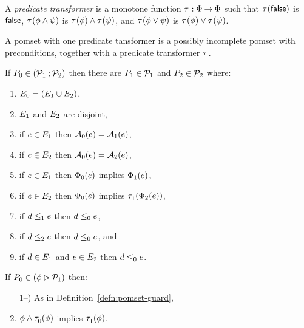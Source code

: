 \begin{definition}
  A \emph{predicate transformer} is a monotone function
  $\tau^{}:\Phi\mathbin\rightarrow\Phi$ such that
  $\tau^{}(\mathsf{false})$ is $\mathsf{false}$,
  $\tau^{}(\phi\land\psi)$ is $\tau^{}(\phi)\land\tau^{}(\psi)$, and
  $\tau^{}(\phi\lor\psi)$ is $\tau^{}(\phi)\lor\tau^{}(\psi)$.
\end{definition}

\begin{definition}
  A pomset with one predicate tansformer is a possibly incomplete
  pomset with preconditions, together with a predicate transformer $\tau^{}$.
\end{definition}

\begin{definition}
  If $P_0 \in (\mathcal{P}_1\mathbin{;}\mathcal{P}_2)$ then
  there are $P_1\in\mathcal{P}_1$ and $P_2\in\mathcal{P}_2$ where:
  \begin{enumerate}
  \item $E_0 = (E_1\cup E_2)$,
  \item $E_1$ and  $E_2$ are disjoint,
  \item if $e\in E_1$ then $\mathcal{A}_0(e) = \mathcal{A}_1(e)$, 
  \item if $e\in E_2$ then $\mathcal{A}_0(e) = \mathcal{A}_2(e)$,
  \item if $e\in E_1$ then $\Phi_0(e)$ implies $\Phi_1(e)$, 
  \item if $e\in E_2$ then $\Phi_0(e)$ implies $\tau^{}_1(\Phi_2(e))$,
  \item if $d\le_1e$ then $d\le_0e$,
  \item if $d\le_2e$ then $d\le_0e$, and
  \item if $d\in E_1$ and $e\in E_2$ then $d\le_0e$.
  \end{enumerate}
\end{definition}

\begin{definition}
  If $P_0 \in (\phi\mathbin\rhd\mathcal{P}_1)$ then:
  \begin{enumerate}
    \setcounter{enumi}{\value{pomsetGuardCount}}
  \item[1--\thepomsetGuardCount)] As in Definition~\ref{defn:pomset-guard},
  \item $\phi\land\tau^{}_0(\phi)$ implies $\tau^{}_1(\phi)$.
  \end{enumerate}
\end{definition}

